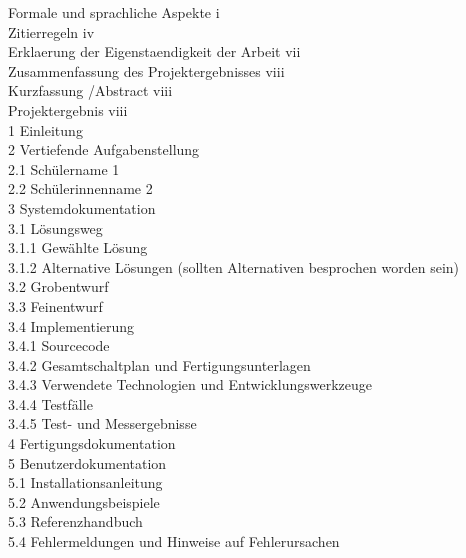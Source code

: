 \documentclass[12pt,a4paper]{article}
\newcommand{\yhbu}[0]{\color{ydkbu}}	%
\begin{document}
{{{\yhbu
	Formale und sprachliche Aspekte \dotfill i		\\
	Zitierregeln \dotfill iv				\\
	Erklaerung der Eigenstaendigkeit der Arbeit \dotfill vii	\\
	Zusammenfassung des Projektergebnisses \dotfill viii		\\
	\phantom{11}Kurzfassung /Abstract \dotfill viii				\\
	\phantom{11}Projektergebnis \dotfill viii					\\
	1 Einleitung 					\\
	2 Vertiefende Aufgabenstellung 		\\
	\phantom{11}2.1 Schülername 1 				\\
	\phantom{11}2.2 Schülerinnenname 2 			\\
	3 Systemdokumentation 			\\
	\phantom{11}3.1 Lösungsweg 				\\
	\phantom{111}3.1.1 Gewählte Lösung 			\\
	\phantom{111}3.1.2 Alternative Lösungen (sollten Alternativen besprochen worden sein) 	\\
	\phantom{11}3.2 Grobentwurf 				\\
	\phantom{11}3.3 Feinentwurf 				\\
	\phantom{11}3.4 Implementierung 				\\
	\phantom{111}3.4.1 Sourcecode 				\\
	\phantom{111}3.4.2 Gesamtschaltplan und Fertigungsunterlagen 	\\
	\phantom{111}3.4.3 Verwendete Technologien und Entwicklungswerkzeuge 	\\
	\phantom{111}3.4.4 Testfälle 				\\
	\phantom{111}3.4.5 Test- und Messergebnisse 		\\
	4 Fertigungsdokumentation 			\\
	5 Benutzerdokumentation 			\\
	\phantom{11}5.1 Installationsanleitung 			\\
	\phantom{11}5.2 Anwendungsbeispiele 			\\
	\phantom{11}5.3 Referenzhandbuch 				\\
	\phantom{11}5.4 Fehlermeldungen und Hinweise auf Fehlerursachen 		\\
}}}
\end{document}

